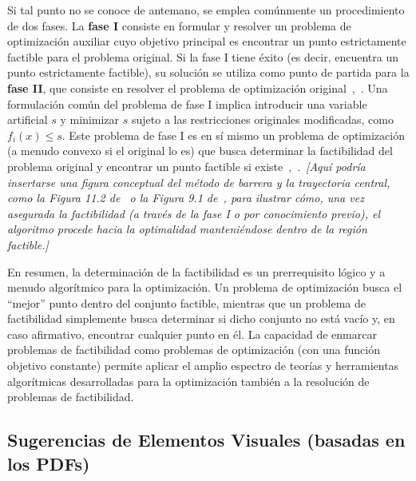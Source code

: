 Si tal punto no se conoce de antemano, se emplea comúnmente un procedimiento de dos fases. La \textbf{fase I} consiste
en formular y resolver un problema de optimización auxiliar cuyo objetivo principal es encontrar un punto estrictamente
factible para el problema original. Si la fase I tiene éxito (es decir, encuentra un punto estrictamente factible), su
solución se utiliza como punto de partida para la \textbf{fase II}, que consiste en resolver el problema de optimización
original~\cite[p.~579]{BoydVandenberghe2004},~\cite[p.~372]{BoydVandenbergheSlides2023}. Una formulación común del
problema de fase I implica introducir una variable artificial $s$ y minimizar $s$ sujeto a las restricciones originales
modificadas, como $f_i(x) \leq s$. Este problema de fase I es en sí mismo un problema de optimización (a menudo convexo
si el original lo es) que busca determinar la factibilidad del problema original y encontrar un punto factible si existe~\cite[p.~579]{BoydVandenberghe2004},~\cite[p.~373]{BoydVandenbergheSlides2023}.\ \textit{[Aquí podría insertarse una
figura conceptual del método de barrera y la trayectoria central, como la Figura 11.2 de~\cite[p.~565]{BoydVandenberghe2004}
o la Figura 9.1 de~\cite[p.~361]{BoydVandenbergheSlides2023}, para ilustrar cómo, una vez asegurada la factibilidad
(a través de la fase I o por conocimiento previo), el algoritmo procede hacia la optimalidad manteniéndose dentro de la
región factible.]}

En resumen, la determinación de la factibilidad es un prerrequisito lógico y a menudo algorítmico para la optimización.
Un problema de optimización busca el ``mejor'' punto dentro del conjunto factible, mientras que un problema de factibilidad
simplemente busca determinar si dicho conjunto no está vacío y, en caso afirmativo, encontrar cualquier punto en él.
La capacidad de enmarcar problemas de factibilidad como problemas de optimización (con una función objetivo constante)
permite aplicar el amplio espectro de teorías y herramientas algorítmicas desarrolladas para la optimización también a la
resolución de problemas de factibilidad.

\subsection*{Sugerencias de Elementos Visuales (basadas en los PDFs)}\label{sec:visual_suggestions}

